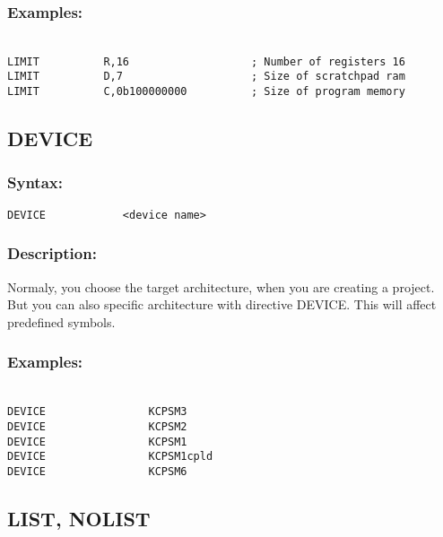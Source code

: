         \subsubsection{Examples:}
        {
            ~\\
            \usecodefont            
            \verb'LIMIT          R,16                   ; Number of registers 16'\\
            \verb'LIMIT          D,7                    ; Size of scratchpad ram   '\\
            \verb'LIMIT          C,0b100000000          ; Size of program memory '\\
        }
        
    \subsection{DEVICE}
        \subsubsection{Syntax:}
        \verb'DEVICE            <device name>'

        \subsubsection{Description:}
        Normaly, you choose the target architecture, when you are creating a project. But you can also specific architecture with directive DEVICE.
        This will affect predefined symbols.

        \subsubsection{Examples:}
        {
            ~\\
            \usecodefont       
            \verb'DEVICE                KCPSM3'\\
            \verb'DEVICE                KCPSM2'\\
            \verb'DEVICE                KCPSM1'\\
            \verb'DEVICE                KCPSM1cpld'\\
            \verb'DEVICE                KCPSM6'\\
        }

    \subsection{LIST, NOLIST}
